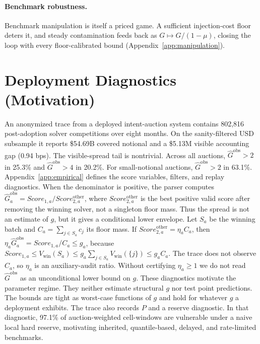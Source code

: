 \documentclass{llncs}
\begin{document}
\paragraph{Benchmark robustness.}
Benchmark manipulation is itself a priced game. A sufficient injection-cost
floor deters it, and steady contamination feeds back as
$G\mapsto G/(1-\mu)$, closing the loop with every floor-calibrated bound
(Appendix~\ref{app:manipulation}).

\section{Deployment Diagnostics (Motivation)}\label{sec:empirics}

An anonymized trace from a deployed intent-auction system contains 802,816 post-adoption solver
competitions over eight months. On the sanity-filtered USD subsample it
reports \$54.69B covered notional and a \$5.13M visible accounting gap
(0.94 bps). The visible-spread tail is nontrivial. Across all auctions,
$\widehat G^{\mathrm{obs}}>2$ in 25.3\% and
$\widehat G^{\mathrm{obs}}>4$ in 20.2\%. For small-notional auctions,
$\widehat G^{\mathrm{obs}}>2$ in 63.1\%. Appendix~\ref{app:empirical}
defines the score variables, filters, and replay diagnostics.
When the denominator is positive, the parser computes
$\widehat G^{\mathrm{obs}}_a=Score_{1,a}/Score^{\mathrm{other}}_{2,a}$,
where $Score^{\mathrm{other}}_{2,a}$ is the best positive valid score
after removing the winning solver, not a singleton floor mass. Thus the
spread is not an estimate of $g$, but it gives a conditional lower
envelope. Let $S_a$ be the winning batch and
$C_a=\sum_{j\in S_a}c_j$ its floor mass. If
$Score^{\mathrm{other}}_{2,a}=\eta_a C_a$, then
$\eta_a\widehat G^{\mathrm{obs}}_a=Score_{1,a}/C_a\le g_a$, because
$Score_{1,a}\le V_{\mathrm{win}}(S_a)\le
g_a\sum_{j\in S_a}V_{\mathrm{win}}(\{j\})\le g_aC_a$.
The trace does not observe $C_a$, so $\eta_a$ is an auxiliary-audit
ratio. Without certifying $\eta_a\ge1$ we do not read
$\widehat G^{\mathrm{obs}}$ as an unconditional lower bound on $g$.
These diagnostics motivate the parameter regime. They neither estimate
structural $g$ nor test point predictions. The bounds are tight as
worst-case functions of $g$ and hold for whatever $g$ a deployment
exhibits. The trace also records $P$ and a reserve diagnostic. In that
diagnostic, 97.1\% of
auction-weighted cell-windows are vulnerable under a naive local hard
reserve, motivating inherited, quantile-based, delayed, and rate-limited
benchmarks.
\end{document}
